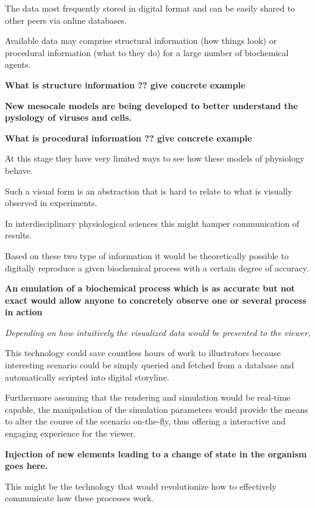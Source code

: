 The data most frequently stored in digital format and can be easily shared to other peers via online databases.

Available data may comprise structural information (how things look) or procedural information (what to they do) for a large number of biochemical agents.

\textbf{What is structure information ?? give concrete example}

\textbf{New mesocale models are being developed to better understand the pysiology of viruses and cells.}

\textbf{What is procedural information ?? give concrete example}

At this stage they have very limited ways to see how these models of physiology behave. 

Such a visual form is an abstraction that is hard to relate to what is visually observed in experiments. 

In interdisciplinary physiological sciences this might hamper communication of results. 

Based on these two type of information it would be theoretically possible to digitally reproduce a given biochemical process with a certain degree of accuracy.

\textbf{An emulation of a biochemical process which is as accurate but not exact would allow anyone to concretely observe one or several process in action}

\textit{Depending on how intuitively the visualized data would be presented to the viewer, }

This technology could save countless hours of work to illustrators because interesting scenario could be simply queried and fetched from a database and automatically scripted into digital storyline.

Furthermore assuming that the rendering and simulation would be real-time capable, the manipulation of the simulation parameters would provide the means to alter the course of the scenario on-the-fly, thus offering a interactive and engaging experience for the viewer.

\textbf{Injection of new elements leading to a change of state in the organism goes here.}

This might be the technology that would revolutionize how to effectively communicate how these processes work.

